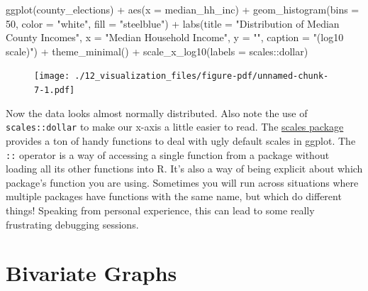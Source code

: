 \documentclass[
  letterpaper,
]{book}
\newenvironment{Shaded}{\begin{snugshade}}{\end{snugshade}}
\newcommand{\AttributeTok}[1]{\textcolor[rgb]{0.40,0.45,0.13}{#1}}
\newcommand{\DecValTok}[1]{\textcolor[rgb]{0.68,0.00,0.00}{#1}}
\newcommand{\FunctionTok}[1]{\textcolor[rgb]{0.28,0.35,0.67}{#1}}
\newcommand{\NormalTok}[1]{\textcolor[rgb]{0.00,0.23,0.31}{#1}}
\newcommand{\SpecialCharTok}[1]{\textcolor[rgb]{0.37,0.37,0.37}{#1}}
\newcommand{\StringTok}[1]{\textcolor[rgb]{0.13,0.47,0.30}{#1}}
\theoremstyle{definition}
\theoremstyle{definition}
\theoremstyle{plain}
\theoremstyle{definition}
\theoremstyle{plain}
\theoremstyle{plain}
\theoremstyle{remark}
\begin{document}
\begin{Shaded}
\begin{Highlighting}[]
\FunctionTok{ggplot}\NormalTok{(county\_elections) }\SpecialCharTok{+}
  \FunctionTok{aes}\NormalTok{(}\AttributeTok{x =}\NormalTok{ median\_hh\_inc) }\SpecialCharTok{+}
  \FunctionTok{geom\_histogram}\NormalTok{(}\AttributeTok{bins =} \DecValTok{50}\NormalTok{,}
                 \AttributeTok{color =} \StringTok{"white"}\NormalTok{,}
                 \AttributeTok{fill =} \StringTok{"steelblue"}\NormalTok{) }\SpecialCharTok{+}
  \FunctionTok{labs}\NormalTok{(}\AttributeTok{title =} \StringTok{"Distribution of Median County Incomes"}\NormalTok{,}
       \AttributeTok{x =} \StringTok{"Median Household Income"}\NormalTok{,}
       \AttributeTok{y =} \StringTok{""}\NormalTok{,}
       \AttributeTok{caption =} \StringTok{"(log10 scale)"}\NormalTok{) }\SpecialCharTok{+}
  \FunctionTok{theme\_minimal}\NormalTok{() }\SpecialCharTok{+}
  \FunctionTok{scale\_x\_log10}\NormalTok{(}\AttributeTok{labels =}\NormalTok{ scales}\SpecialCharTok{::}\NormalTok{dollar)}
\end{Highlighting}
\end{Shaded}

\begin{figure}[H]

{\centering \texttt{[image: ./12\_visualization\_files/figure-pdf/unnamed-chunk-7-1.pdf]}

}

\end{figure}

Now the data looks almost normally distributed. Also note the use of
\texttt{scales::dollar} to make our x-axis a little easier to read. The
\href{https://scales.r-lib.org/}{scales package} provides a ton of handy
functions to deal with ugly default scales in ggplot. The \texttt{::}
operator is a way of accessing a single function from a package without
loading all its other functions into R. It's also a way of being
explicit about which package's function you are using. Sometimes you
will run across situations where multiple packages have functions with
the same name, but which do different things! Speaking from personal
experience, this can lead to some really frustrating debugging sessions.

\hypertarget{bivariate-graphs}{%
\section{Bivariate Graphs}\label{bivariate-graphs}}
\end{document}
